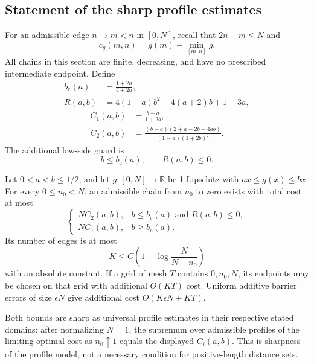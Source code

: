 \subsection{Statement of the sharp profile estimates}
\label{hardgap:statement}

For an admissible edge \(n\to m<n\) in \([0,N]\), recall that
\(2n-m\le N\) and
\[
 c_g(m,n)=g(m)-\min_{[m,n]}g.
\]
All chains in this section are finite, decreasing, and have no prescribed
intermediate endpoint. Define
\begin{align}
 b_{\mathrm c}(a)&=\frac{1+2a}{4+2a},
       \label{hardgap:transition}\\
 R(a,b)&=4(1+a)b^2-4(a+2)b+1+3a,
       \label{hardgap:R}
\end{align}
\begin{subequations}\label{hardgap:costs}
\begin{align}
 C_1(a,b)&=\frac{b-a}{1+2b},
       \label{hardgap:C1}\\
 C_2(a,b)&=\frac{(b-a)(2+a-2b-4ab)}{(1-a)(1+2b)^2}.
       \label{hardgap:C2}
\end{align}
\end{subequations}
The additional low-side guard is
\begin{equation}\label{hardgap:guard}
 b\le b_{\mathrm c}(a),\qquad R(a,b)\le0.
\end{equation}

\begin{theorem}\label{hardgap:profile}
Let \(0<a<b\le1/2\), and let \(g:[0,N]\to\mathbb R\) be
1-Lipschitz with \(ax\le g(x)\le bx\). For every
\(0\le n_0<N\), an admissible chain from \(n_0\) to zero exists
with total cost at most
\[
 \begin{cases}
 NC_2(a,b),&b\le b_{\mathrm c}(a)\text{ and }R(a,b)\le0,\\
 NC_1(a,b),&b\ge b_{\mathrm c}(a).
 \end{cases}
\]
Its number of edges is at most
\[
 K\le C\left(1+\log\frac{N}{N-n_0}\right)
\]
with an absolute constant. If a grid of mesh \(T\) contains
\(0,n_0,N\), its endpoints may be chosen on that grid with additional
\(O(KT)\) cost. Uniform additive barrier errors of size \(\epsilon N\)
give additional cost \(O(K\epsilon N+KT)\).

Both bounds are sharp as universal profile estimates in their respective
stated domains: after normalizing \(N=1\), the supremum over admissible
profiles of the limiting optimal cost as \(n_0\uparrow1\) equals the
displayed \(C_i(a,b)\). This is sharpness of the profile model, not a
necessary condition for positive-length distance sets.
\end{theorem}

